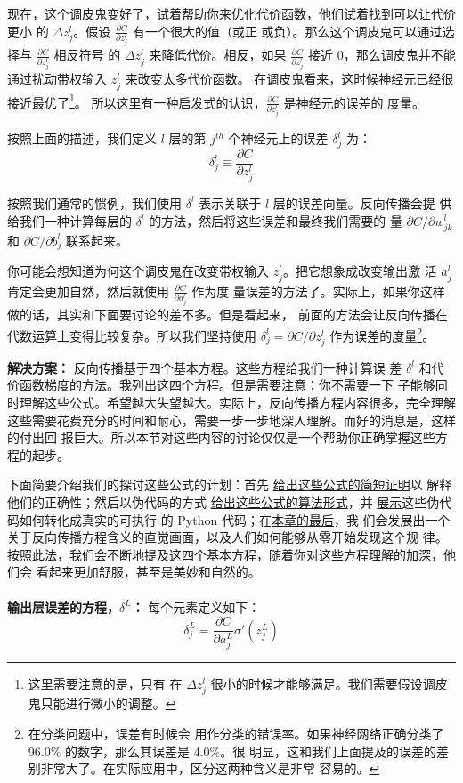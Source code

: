 现在，这个调皮鬼变好了，试着帮助你来优化代价函数，他们试着找到可以让代价更小
的 $\Delta z_j^l$。假设 $\frac{\partial C}{\partial z_j^l}$ 有一个很大的值（或正
或负）。那么这个调皮鬼可以通过选择与 $\frac{\partial C}{\partial z_j^l}$ 相反符号
的 $\Delta z_j^l$ 来降低代价。相反，如果 $\frac{\partial C}{\partial
  z_j^l}$ 接近 $0$，那么调皮鬼并不能通过扰动带权输入 $z_j^l$ 来改变太多代价函数。
在调皮鬼看来，这时候神经元已经很接近最优了\footnote{这里需要注意的是，只有
  在 $\Delta z_j^l$ 很小的时候才能够满足。我们需要假设调皮鬼只能进行微小的调整。}。
所以这里有一种启发式的认识，$\frac{\partial C}{\partial z_j^l}$ 是神经元的误差的
度量。

按照上面的描述，我们定义 $l$ 层的第 $j^{th}$ 个神经元上的误差 $\delta_j^l$ 为：
\begin{equation}
  \delta^l_j \equiv \frac{\partial C}{\partial z^l_j}
  \label{eq:29}\tag{29}
\end{equation}

按照我们通常的惯例，我们使用 $\delta^l$ 表示关联于 $l$ 层的误差向量。反向传播会提
供给我们一种计算每层的 $\delta^l$ 的方法，然后将这些误差和最终我们需要的
量 $\partial C/\partial w_{jk}^l$ 和 $\partial C/\partial b_j^l$ 联系起来。

你可能会想知道为何这个调皮鬼在改变带权输入 $z_j^l$。把它想象成改变输出激
活 $a_j^l$ 肯定会更加自然，然后就使用 $\frac{\partial C}{\partial a_j^l}$ 作为度
量误差的方法了。实际上，如果你这样做的话，其实和下面要讨论的差不多。但是看起来，
前面的方法会让反向传播在代数运算上变得比较复杂。所以我们坚持使用 $\delta_j^l
= \partial C / \partial z_j^l$ 作为误差的度量\footnote{在分类问题中，误差有时候会
  用作分类的错误率。如果神经网络正确分类了 96.0\% 的数字，那么其误差是 4.0\%。很
  明显，这和我们上面提及的误差的差别非常大了。在实际应用中，区分这两种含义是非常
  容易的。}。

\textbf{解决方案：} 反向传播基于四个基本方程。这些方程给我们一种计算误
差 $\delta^l$ 和代价函数梯度的方法。我列出这四个方程。但是需要注意：你不需要一下
子能够同时理解这些公式。希望越大失望越大。实际上，反向传播方程内容很多，完全理解
这些需要花费充分的时间和耐心，需要一步一步地深入理解。而好的消息是，这样的付出回
报巨大。所以本节对这些内容的讨论仅仅是一个帮助你正确掌握这些方程的起步。

下面简要介绍我们的探讨这些公式的计划：首先%
\hyperref[sec:proof_of_the_four_fundamental_equations]{给出这些公式的简短证明}以
解释他们的正确性；然后以伪代码的方式%
\hyperref[sec:the_backpropagation_algorithm]{给出这些公式的算法形式}，并%
\hyperref[sec:the_code_for_backpropagation]{展示}这些伪代码如何转化成真实的可执行
的 Python 代码；在\hyperref[sec:backpropagation_the_big_picture]{本章的最后}，我
们会发展出一个关于反向传播方程含义的直觉画面，以及人们如何能够从零开始发现这个规
律。按照此法，我们会不断地提及这四个基本方程，随着你对这些方程理解的加深，他们会
看起来更加舒服，甚至是美妙和自然的。
\\
\\
\textbf{输出层误差的方程，$\delta^L$：} 每个元素定义如下：
\begin{equation} 
  \delta^L_j = \frac{\partial C}{\partial a^L_j} \sigma'(z^L_j)
  \label{eq:bp1}\tag{BP1}
\end{equation}


